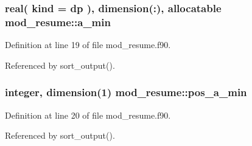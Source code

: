 \subsubsection[{\texorpdfstring{a\+\_\+min}{a_min}}]{\setlength{\rightskip}{0pt plus 5cm}real( kind = dp ), dimension(\+:), allocatable mod\+\_\+resume\+::a\+\_\+min}\hypertarget{namespacemod__resume_ad3cf0f0162ccc00d0efebb0348fe6ae5}{}\label{namespacemod__resume_ad3cf0f0162ccc00d0efebb0348fe6ae5}


Definition at line 19 of file mod\+\_\+resume.\+f90.



Referenced by sort\+\_\+output().

\subsubsection[{\texorpdfstring{pos\+\_\+a\+\_\+min}{pos_a_min}}]{\setlength{\rightskip}{0pt plus 5cm}integer, dimension(1) mod\+\_\+resume\+::pos\+\_\+a\+\_\+min}\hypertarget{namespacemod__resume_a2861e2f353be05850b4ad384446859c6}{}\label{namespacemod__resume_a2861e2f353be05850b4ad384446859c6}


Definition at line 20 of file mod\+\_\+resume.\+f90.



Referenced by sort\+\_\+output().


